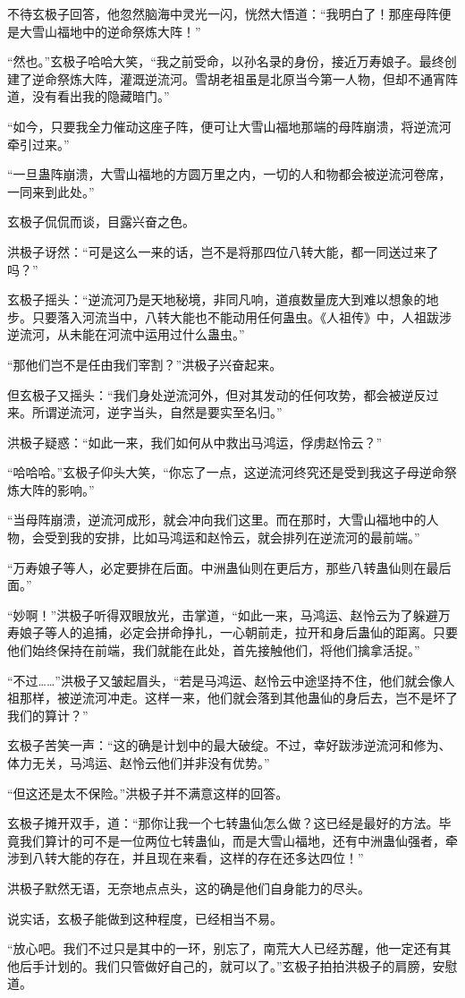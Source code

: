 \begin{this_body}
不待玄极子回答，他忽然脑海中灵光一闪，恍然大悟道：“我明白了！那座母阵便是大雪山福地中的逆命祭炼大阵！”

“然也。”玄极子哈哈大笑，“我之前受命，以孙名录的身份，接近万寿娘子。最终创建了逆命祭炼大阵，灌溉逆流河。雪胡老祖虽是北原当今第一人物，但却不通宵阵道，没有看出我的隐藏暗门。”

“如今，只要我全力催动这座子阵，便可让大雪山福地那端的母阵崩溃，将逆流河牵引过来。”

“一旦蛊阵崩溃，大雪山福地的方圆万里之内，一切的人和物都会被逆流河卷席，一同来到此处。”

玄极子侃侃而谈，目露兴奋之色。

洪极子讶然：“可是这么一来的话，岂不是将那四位八转大能，都一同送过来了吗？”

玄极子摇头：“逆流河乃是天地秘境，非同凡响，道痕数量庞大到难以想象的地步。只要落入河流当中，八转大能也不能动用任何蛊虫。《人祖传》中，人祖跋涉逆流河，从未能在河流中运用过什么蛊虫。”

“那他们岂不是任由我们宰割？”洪极子兴奋起来。

但玄极子又摇头：“我们身处逆流河外，但对其发动的任何攻势，都会被逆反过来。所谓逆流河，逆字当头，自然是要实至名归。”

洪极子疑惑：“如此一来，我们如何从中救出马鸿运，俘虏赵怜云？”

“哈哈哈。”玄极子仰头大笑，“你忘了一点，这逆流河终究还是受到我这子母逆命祭炼大阵的影响。”

“当母阵崩溃，逆流河成形，就会冲向我们这里。而在那时，大雪山福地中的人物，会受到我的安排，比如马鸿运和赵怜云，就会排列在逆流河的最前端。”

“万寿娘子等人，必定要排在后面。中洲蛊仙则在更后方，那些八转蛊仙则在最后面。”

“妙啊！”洪极子听得双眼放光，击掌道，“如此一来，马鸿运、赵怜云为了躲避万寿娘子等人的追捕，必定会拼命挣扎，一心朝前走，拉开和身后蛊仙的距离。只要他们始终保持在前端，我们就能在此处，首先接触他们，将他们擒拿活捉。”

“不过……”洪极子又皱起眉头，“若是马鸿运、赵怜云中途坚持不住，他们就会像人祖那样，被逆流河冲走。这样一来，他们就会落到其他蛊仙的身后去，岂不是坏了我们的算计？”

玄极子苦笑一声：“这的确是计划中的最大破绽。不过，幸好跋涉逆流河和修为、体力无关，马鸿运、赵怜云他们并非没有优势。”

“但这还是太不保险。”洪极子并不满意这样的回答。

玄极子摊开双手，道：“那你让我一个七转蛊仙怎么做？这已经是最好的方法。毕竟我们算计的可不是一位两位七转蛊仙，而是大雪山福地，还有中洲蛊仙强者，牵涉到八转大能的存在，并且现在来看，这样的存在还多达四位！”

洪极子默然无语，无奈地点点头，这的确是他们自身能力的尽头。

说实话，玄极子能做到这种程度，已经相当不易。

“放心吧。我们不过只是其中的一环，别忘了，南荒大人已经苏醒，他一定还有其他后手计划的。我们只管做好自己的，就可以了。”玄极子拍拍洪极子的肩膀，安慰道。

\end{this_body}

